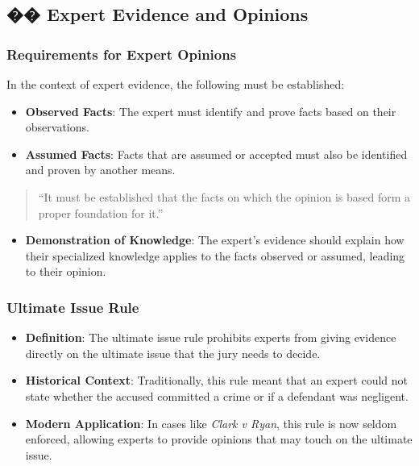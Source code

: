 \subsection{�� Expert Evidence and
Opinions}\label{expert-evidence-and-opinions}

\subsubsection{Requirements for Expert
Opinions}\label{requirements-for-expert-opinions}

In the context of expert evidence, the following must be established:

\begin{itemize}
\tightlist
\item
  \textbf{Observed Facts}: The expert must identify and prove facts
  based on their observations.
\item
  \textbf{Assumed Facts}: Facts that are assumed or accepted must also
  be identified and proven by another means.
\end{itemize}

\begin{quote}
``It must be established that the facts on which the opinion is based
form a proper foundation for it.''
\end{quote}

\begin{itemize}
\tightlist
\item
  \textbf{Demonstration of Knowledge}: The expert's evidence should
  explain how their specialized knowledge applies to the facts observed
  or assumed, leading to their opinion.
\end{itemize}

\subsubsection{Ultimate Issue Rule}\label{ultimate-issue-rule}

\begin{itemize}
\item
  \textbf{Definition}: The ultimate issue rule prohibits experts from
  giving evidence directly on the ultimate issue that the jury needs to
  decide.
\item
  \textbf{Historical Context}: Traditionally, this rule meant that an
  expert could not state whether the accused committed a crime or if a
  defendant was negligent.
\item
  \textbf{Modern Application}: In cases like \emph{Clark v Ryan}, this
  rule is now seldom enforced, allowing experts to provide opinions that
  may touch on the ultimate issue.
\end{itemize}

